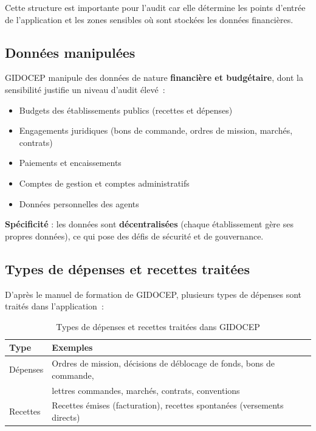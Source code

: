 \documentclass[12pt,a4paper,oneside]{report}
\begin{document}
Cette structure est importante pour l'audit car elle détermine les points d'entrée de l'application et les zones sensibles où sont stockées les données financières.

\subsection{Données manipulées}

GIDOCEP manipule des données de nature \textbf{financière et budgétaire}, dont la sensibilité justifie un niveau d'audit élevé~:

\begin{itemize}[label={\color{gold}}, leftmargin=*]
	\item Budgets des établissements publics (recettes et dépenses)
	\item Engagements juridiques (bons de commande, ordres de mission, marchés, contrats)
	\item Paiements et encaissements
	\item Comptes de gestion et comptes administratifs
	\item Données personnelles des agents
\end{itemize}

\textbf{Spécificité} : les données sont \textbf{décentralisées} (chaque établissement gère ses propres données), ce qui pose des défis de sécurité et de gouvernance.

\subsection{Types de dépenses et recettes traitées}

D'après le manuel de formation de GIDOCEP, plusieurs types de dépenses sont traités dans l'application~:

\begin{table}[H]
	\centering\small
	\caption{Types de dépenses et recettes traitées dans GIDOCEP}
	\label{tab:types_dossiers}
	\begin{tabularx}{\textwidth}{p{4cm}X}
		\toprule
		\rowcolor{theadcolor}
		\color{white}\textbf{Type} &
		\color{white}\textbf{Exemples} \\
		\midrule
		Dépenses & Ordres de mission, décisions de déblocage de fonds, bons de commande, \\
		& lettres commandes, marchés, contrats, conventions \\
		Recettes & Recettes émises (facturation), recettes spontanées (versements directs) \\
		\bottomrule
	\end{tabularx}
\end{table}
\end{document}
